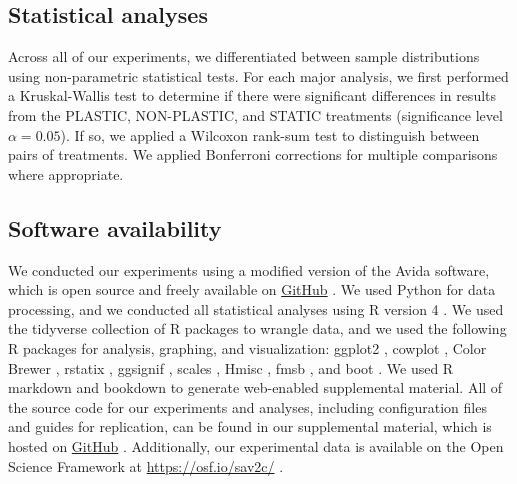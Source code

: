 \subsection{Statistical analyses}

Across all of our experiments, we differentiated between sample distributions using non-parametric statistical tests.
For each major analysis, we first performed a Kruskal-Wallis test \citep{kruskal_use_1952} to 
determine if there were significant differences in results from the PLASTIC, NON-PLASTIC, and STATIC treatments (significance level $\alpha=0.05$).
If so, we applied a Wilcoxon rank-sum test \citep{kotz_individual_1992} to distinguish between pairs of treatments.
We applied Bonferroni corrections for multiple comparisons \citep{rice_analyzing_1989} where appropriate.

\subsection{Software availability}

We conducted our experiments using a modified version of the Avida software, which is open source and freely available on \href{https://github.com/amlalejini/evolutionary-consequences-of-plasticity}{GitHub} \citep{supplemental_material}.
We used Python for data processing, and we conducted all statistical analyses using R version 4 \citep{r_core_team_r_v4}.
We used the tidyverse collection of R packages \citep{r_tidyverse_2019} to wrangle data, and we used the following R packages for analysis, graphing, and visualization: 
ggplot2 \citep{R-ggplot2}, 
cowplot \citep{R-cowplot}, 
Color Brewer \citep{harrower_colorbrewerorg_2003,R-Brewer_2014}, 
rstatix \citep{R-rstatix},
ggsignif \citep{R-ggsignif},
scales \citep{R-scales},
Hmisc \citep{R-Hmisc}, 
fmsb \citep{R-fmsb}, 
and boot \citep{R-boot}.
We used R markdown \citep{rmarkdown} and bookdown \citep{R-bookdown} to generate web-enabled supplemental material.
All of the source code for our experiments and analyses, including configuration files and guides for replication, can be found in our supplemental material, which is hosted on \href{https://github.com/amlalejini/evolutionary-consequences-of-plasticity}{GitHub} \citep{supplemental_material}.
Additionally, our experimental data is available on the Open Science Framework at \url{https://osf.io/sav2c/} \citep{osf_data}.